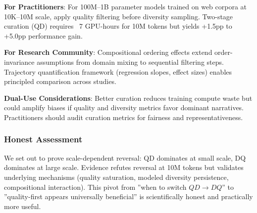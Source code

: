 \textbf{For Practitioners}: For 100M--1B parameter models trained on web corpora at 10K--10M scale, apply quality filtering before diversity sampling. Two-stage curation (QD) requires ~7 GPU-hours for 10M tokens but yields +1.5pp to +5.0pp performance gain.

\textbf{For Research Community}: Compositional ordering effects extend order-invariance assumptions from domain mixing to sequential filtering steps. Trajectory quantification framework (regression slopes, effect sizes) enables principled comparison across studies.

\textbf{Dual-Use Considerations}: Better curation reduces training compute waste but could amplify biases if quality and diversity metrics favor dominant narratives. Practitioners should audit curation metrics for fairness and representativeness.

\subsubsection{Honest Assessment}

We set out to prove scale-dependent reversal: QD dominates at small scale, DQ dominates at large scale. Evidence refutes reversal at 10M tokens but validates underlying mechanisms (quality saturation, modeled diversity persistence, compositional interaction). This pivot from ''when to switch $QD\rightarrow DQ$'' to ''quality-first appears universally beneficial'' is scientifically honest and practically more useful.
